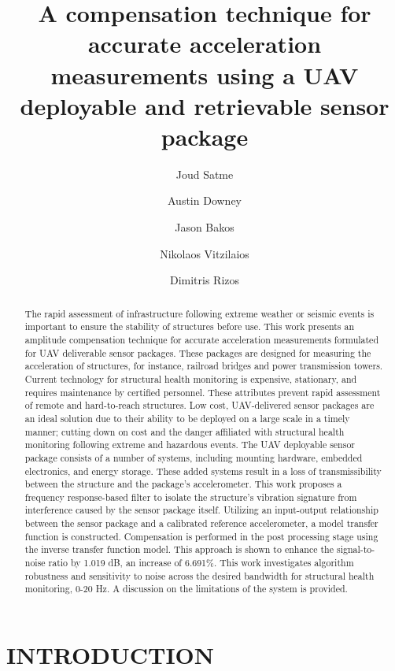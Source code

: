 \documentclass[]{spie}  %
\title{A compensation technique for accurate acceleration measurements using a UAV deployable and retrievable sensor package}
\author[a]{Joud Satme}
\author[b]{Austin Downey}
\author[c]{Jason Bakos}
\author[d]{Nikolaos Vitzilaios}
\author[e]{Dimitris Rizos}
\affil[a]{University of South Carolina, 300 Main St., Columbia, SC, USA 29201}
\affil[b]{Mechanical Engineering Department}
\affil[c]{Computer Science Department}
\affil[d]{Mechanical Engineering Department}
\affil[e]{Civil Engineering Department}
\begin{document}
 
	\maketitle
	
	\begin{abstract}
		The rapid assessment of infrastructure following extreme weather or seismic events is important to ensure the stability of structures before use. This work presents an amplitude compensation technique for accurate acceleration measurements formulated for UAV deliverable sensor packages. These packages are designed for measuring the acceleration of structures, for instance, railroad bridges and power transmission towers. Current technology for structural health monitoring is expensive, stationary, and requires maintenance by certified personnel. These attributes prevent rapid assessment of remote and hard-to-reach structures. Low cost, UAV-delivered sensor packages are an ideal solution due to their ability to be deployed on a large scale in a timely manner; cutting down on cost and the danger affiliated with structural health monitoring following extreme and hazardous events. The UAV deployable sensor package consists of a number of systems, including mounting hardware, embedded electronics, and energy storage. These added systems result in a loss of transmissibility between the structure and the package’s accelerometer. This work proposes a frequency response-based filter to isolate the structure’s vibration signature from interference caused by the sensor package itself. Utilizing an input-output relationship between the sensor package and a calibrated reference accelerometer, a model transfer function is constructed. Compensation is performed in the post processing stage using the inverse transfer function model. This approach is shown to enhance the signal-to-noise ratio by 1.019 dB, an increase of 6.691\%. This work investigates algorithm robustness and sensitivity to noise across the desired bandwidth for structural health monitoring, 0-20 Hz. A discussion on the limitations of the system is provided.  
	\end{abstract}
	
	
	\section{INTRODUCTION}
	\label{sec:intro}  %
	
\end{document}
